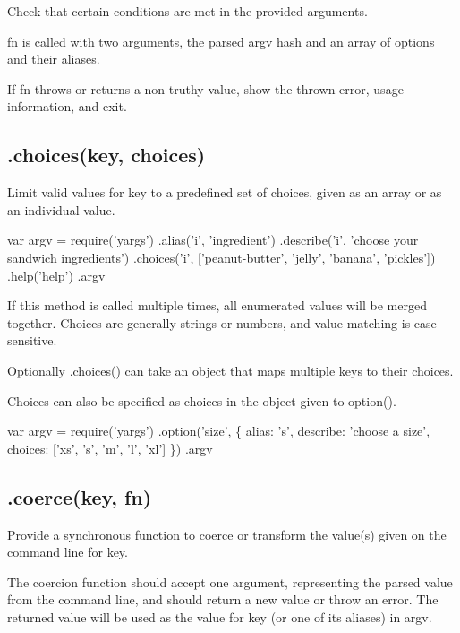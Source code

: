 Check that certain conditions are met in the provided arguments.

{\ttfamily fn} is called with two arguments, the parsed {\ttfamily argv} hash and an array of options and their aliases.

If {\ttfamily fn} throws or returns a non-\/truthy value, show the thrown error, usage information, and exit.

\subsection*{\label{_choices}%
.choices(key, choices) }

Limit valid values for {\ttfamily key} to a predefined set of {\ttfamily choices}, given as an array or as an individual value.


\begin{DoxyCode}
var argv = require('yargs')
  .alias('i', 'ingredient')
  .describe('i', 'choose your sandwich ingredients')
  .choices('i', ['peanut-butter', 'jelly', 'banana', 'pickles'])
  .help('help')
  .argv
\end{DoxyCode}


If this method is called multiple times, all enumerated values will be merged together. Choices are generally strings or numbers, and value matching is case-\/sensitive.

Optionally {\ttfamily .choices()} can take an object that maps multiple keys to their choices.

Choices can also be specified as {\ttfamily choices} in the object given to {\ttfamily option()}.


\begin{DoxyCode}
var argv = require('yargs')
  .option('size', \{
    alias: 's',
    describe: 'choose a size',
    choices: ['xs', 's', 'm', 'l', 'xl']
  \})
  .argv
\end{DoxyCode}


\subsection*{\label{_coerce}%
.coerce(key, fn) }

Provide a synchronous function to coerce or transform the value(s) given on the command line for {\ttfamily key}.

The coercion function should accept one argument, representing the parsed value from the command line, and should return a new value or throw an error. The returned value will be used as the value for {\ttfamily key} (or one of its aliases) in {\ttfamily argv}.

